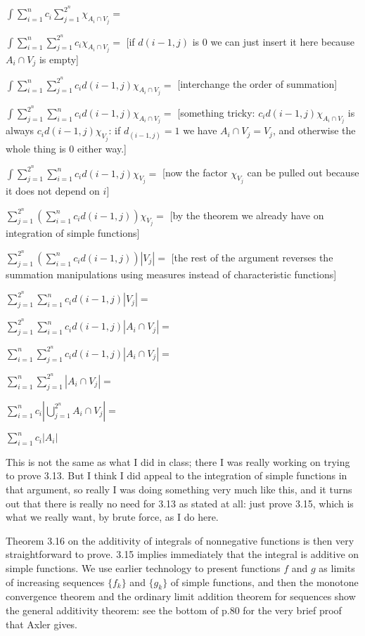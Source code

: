 \documentclass[12pt]{article}
\begin{document}
$\int \sum_{i=1}^n c_i \sum_{j=1}^{2^n}\chi_{A_i \cap V_j}=$

$\int \sum_{i=1}^n \sum_{j=1}^{2^n}c_i\chi_{A_i \cap V_j}=$ [if $d(i-1,j)$ is 0 we can just insert it here because $A_i \cap V_j$ is empty]

$\int \sum_{i=1}^n \sum_{j=1}^{2^n}c_id(i-1,j)\chi_{A_i \cap V_j}=$ [interchange the order of summation]

$\int \sum_{j=1}^{2^n} \sum_{i=1}^n c_id(i-1,j)\chi_{A_i \cap V_j}=$ [something tricky:  $c_id(i-1,j)\chi_{A_i \cap V_j}$ is always $c_id(i-1,j)\chi_{ V_j}$:  if $d_(i-1,j)=1$ we have $A_i \cap V_j=V_j$, and otherwise the whole thing is 0 either way.]

$\int \sum_{j=1}^{2^n} \sum_{i=1}^n c_id(i-1,j)\chi_{V_j}=$ [now the factor $\chi_{V_j}$ can be pulled out because it does not depend on $i$]

$\sum_{j=1}^{2^n} (\sum_{i=1}^n c_id(i-1,j))\chi_{V_j}=$ [by the theorem we already have on integration of simple functions]

$ \sum_{j=1}^{2^n} (\sum_{i=1}^n c_id(i-1,j))|{V_j}|=$ [the rest of the argument reverses the summation manipulations using measures instead of characteristic functions]

$ \sum_{j=1}^{2^n} \sum_{i=1}^n c_id(i-1,j)|V_j|=$

$ \sum_{j=1}^{2^n} \sum_{i=1}^n c_id(i-1,j)|A_i \cap V_j|=$

$ \sum_{i=1}^n \sum_{j=1}^{2^n}c_id(i-1,j)|A_i \cap V_j|=$

$ \sum_{i=1}^n \sum_{j=1}^{2^n}|A_i \cap V_j|=$

$\sum_{i=1}^n c_i|\bigcup_{j=1}^{2^n} A_i \cap V_j| =$

$\sum_{i=1}^nc_i|A_i|$

This is not the same as what I did in class;  there I was really working on trying to prove 3.13.  But I think I did appeal to the integration of simple functions in that argument, so really I was doing something very much like this, and it turns out that there is really no need for 3.13 as stated at all:  just prove 3.15, which is what we really want, by brute force, as I do here.

Theorem 3.16 on the additivity of integrals of nonnegative functions is then very straightforward to prove.  3.15 implies immediately that the integral is additive on simple functions.  We use earlier technology to present functions $f$ and $g$ as limits of increasing sequences $\{f_k\}$ and $\{g_k\}$ of simple functions,
and then the monotone convergence theorem and the ordinary limit addition theorem for sequences show the general additivity theorem:  see the bottom of p.80 
for the very brief proof that Axler gives.
\end{document}
